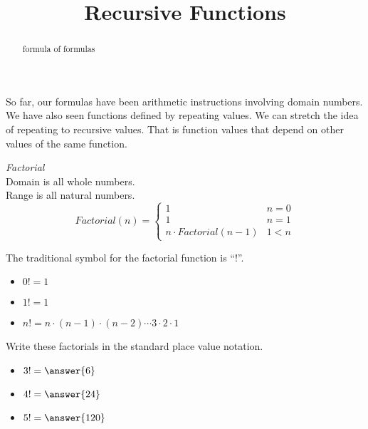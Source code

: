 \documentclass{ximera}
\title{Recursive Functions}
\begin{document}
\begin{abstract}
formula of formulas
\end{abstract}
\maketitle



So far, our formulas have been arithmetic instructions involving domain numbers. We have also seen functions defined by repeating values. We can stretch the idea of repeating to recursive values.  That is function values that depend on other values of the same function.









\begin{example}  \textit{Factorial} \\



Domain is all whole numbers. \\
Range is all natural numbers. \\




\[
Factorial(n) = 
\begin{cases}
  1 & n = 0 \\
  1 & n = 1 \\ 
  n \cdot Factorial(n-1) & 1 < n
\end{cases}
\]

The traditional symbol for the factorial function is ``!''.


\begin{itemize}
  \item $0! = 1$
  \item $1! = 1$
  \item $n! = n \cdot (n-1) \cdot (n-2) \cdots 3 \cdot 2 \cdot 1$
\end{itemize}





\begin{question} Write these factorials in the standard place value notation.


\begin{itemize}
\item $3! = \answer{6}$
\item $4! = \answer{24}$
\item $5! = \answer{120}$
\end{itemize}


\end{question}



\end{example}
\end{document}
